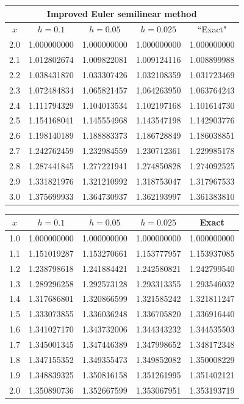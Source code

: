 \documentclass[dvips]{book}
\renewcommand{\exer}[1]{\par\medskip\;\noindent{\color{red}\bf #1.}}
\numberwithin{example}{section}
\numberwithin{equation}{section}
\numberwithin{theorem}{section}
\numberwithin{table}{section}
\numberwithin{figure}{section}
\begin{document}
{\small
\begin{tabular}{|c|r|r|r|r|}
\hline
\multicolumn{5}{|c|}{Improved
 Euler semilinear method}\\\hline
\multicolumn{1}{|c|}{$x$}&
\multicolumn{1}{|c|}{$h=0.1$}&
\multicolumn{1}{|c|}{$h=0.05$}&
\multicolumn{1}{|c|}{$h=0.025$}&
\multicolumn{1}{|c|}{``Exact"}\\ \hline
2.0 & 1.000000000 & 1.000000000 & 1.000000000 & 1.000000000 \\
2.1 & 1.012802674 & 1.009822081 & 1.009124116 & 1.008899988 \\
2.2 & 1.038431870 & 1.033307426 & 1.032108359 & 1.031723469 \\
2.3 & 1.072484834 & 1.065821457 & 1.064263950 & 1.063764243 \\
2.4 & 1.111794329 & 1.104013534 & 1.102197168 & 1.101614730 \\
2.5 & 1.154168041 & 1.145554968 & 1.143547198 & 1.142903776 \\
2.6 & 1.198140189 & 1.188883373 & 1.186728849 & 1.186038851 \\
2.7 & 1.242762459 & 1.232984559 & 1.230712361 & 1.229985178 \\
2.8 & 1.287441845 & 1.277221941 & 1.274850828 & 1.274092525 \\
2.9 & 1.331821976 & 1.321210992 & 1.318753047 & 1.317967533 \\
3.0 & 1.375699933 & 1.364730937 & 1.362193997 & 1.361383810 \\
\hline
\end{tabular}}


\exer{3.2.24}
{\small
\begin{tabular}{|c|r|r|r|r|}\hline
\multicolumn{1}{|c|}{$x$}&
\multicolumn{1}{|c|}{$h=0.1$}&
\multicolumn{1}{|c|}{$h=0.05$}&
\multicolumn{1}{|c|}{$h=0.025$}&
\multicolumn{1}{|c|}{Exact}\\ \hline
1.0 & 1.000000000 & 1.000000000 & 1.000000000 & 1.000000000 \\
1.1 & 1.151019287 & 1.153270661 & 1.153777957 & 1.153937085 \\
1.2 & 1.238798618 & 1.241884421 & 1.242580821 & 1.242799540 \\
1.3 & 1.289296258 & 1.292573128 & 1.293313355 & 1.293546032 \\
1.4 & 1.317686801 & 1.320866599 & 1.321585242 & 1.321811247 \\
1.5 & 1.333073855 & 1.336036248 & 1.336705820 & 1.336916440 \\
1.6 & 1.341027170 & 1.343732006 & 1.344343232 & 1.344535503 \\
1.7 & 1.345001345 & 1.347446389 & 1.347998652 & 1.348172348 \\
1.8 & 1.347155352 & 1.349355473 & 1.349852082 & 1.350008229 \\
1.9 & 1.348839325 & 1.350816158 & 1.351261995 & 1.351402121 \\
2.0 & 1.350890736 & 1.352667599 & 1.353067951 & 1.353193719\\
\hline
\end{tabular}}
\end{document}
